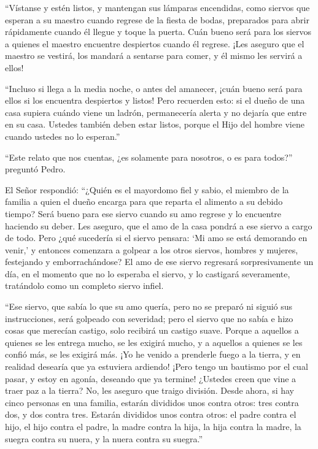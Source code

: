  ``Vístanse y estén listos, y mantengan sus lámparas
encendidas,  como siervos que esperan a su maestro cuando
regrese de la fiesta de bodas, preparados para abrir rápidamente cuando
él llegue y toque la puerta.  Cuán bueno será para los
siervos a quienes el maestro encuentre despiertos cuando él regrese.
¡Les aseguro que el maestro se vestirá, los mandará a sentarse para
comer, y él mismo les servirá a ellos!

 ``Incluso si llega a la media noche, o antes del amanecer,
¡cuán bueno será para ellos si los encuentra despiertos y listos!
 Pero recuerden esto: si el dueño de una casa supiera
cuándo viene un ladrón, permanecería alerta y no dejaría que entre en su
casa.  Ustedes también deben estar listos, porque el Hijo
del hombre viene cuando ustedes no lo esperan.''

 ``Este relato que nos cuentas, ¿es solamente para
nosotros, o es para todos?'' preguntó Pedro.

 El Señor respondió: ``¿Quién es el mayordomo fiel y sabio,
el miembro de la familia a quien el dueño encarga para que reparta el
alimento a su debido tiempo?  Será bueno para ese siervo
cuando su amo regrese y lo encuentre haciendo su deber. 
Les aseguro, que el amo de la casa pondrá a ese siervo a cargo de todo.
 Pero ¿qué sucedería si el siervo pensara: `Mi amo se está
demorando en venir,' y entonces comenzara a golpear a los otros siervos,
hombres y mujeres, festejando y emborrachándose?  El amo de
ese siervo regresará sorpresivamente un día, en el momento que no lo
esperaba el siervo, y lo castigará severamente, tratándolo como un
completo siervo infiel.

 ``Ese siervo, que sabía lo que su amo quería, pero no se
preparó ni siguió sus instrucciones, será golpeado con severidad;
 pero el siervo que no sabía e hizo cosas que merecían
castigo, solo recibirá un castigo suave. Porque a aquellos a quienes se
les entrega mucho, se les exigirá mucho, y a aquellos a quienes se les
confió más, se les exigirá más.  ¡Yo he venido a prenderle
fuego a la tierra, y en realidad desearía que ya estuviera ardiendo!
 ¡Pero tengo un bautismo por el cual pasar, y estoy en
agonía, deseando que ya termine!  ¿Ustedes creen que vine a
traer paz a la tierra? No, les aseguro que traigo división.
 Desde ahora, si hay cinco personas en una familia, estarán
divididos unos contra otros: tres contra dos, y dos contra tres.
 Estarán divididos unos contra otros: el padre contra el
hijo, el hijo contra el padre, la madre contra la hija, la hija contra
la madre, la suegra contra su nuera, y la nuera contra su suegra.''


